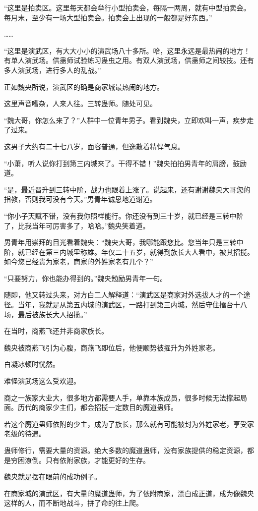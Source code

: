 \begin{this_body}
“这里是拍卖区。这里每天都会举行小型拍卖会，每隔一两周，就有中型拍卖会。每月末，至少有一场大型拍卖会。拍卖会上出现的一般都是好东西。”

……

“这里是演武区，有大大小小的演武场八十多所。哈，这里永远是最热闹的地方！有单人演武场。供蛊师试验练习蛊虫之用。有双人演武场，供蛊师之间较技。还有多人演武场，进行多人的乱战。”

正如魏央所说，演武区的确是商家城最热闹的地方。

这里声音嘈杂，人来人往。三转蛊师。随处可见。

“魏大哥，你怎么来了？”人群中一位青年男子。看到魏央，立即欢叫一声，疾步走了过来。

这男子大约有二十七八岁，面容普通，但逸散着精悍气息。

“小萧，听人说你打到第三内城来了。干得不错！”魏央拍拍男青年的肩膀，鼓励道。

“是，最近晋升到三转中阶，战力也跟着上涨了。说起来，还有谢谢魏央大哥您的指教，否则我可没有今天。”男青年诚恳地道谢道。

“你小子天赋不错，没有我你照样能行。你还没有到三十岁，就已经是三转中阶了，比我当年可厉害多了，哈哈。”魏央笑着道。

男青年用崇拜的目光看着魏央：“魏央大哥，我哪能跟您比。您当年只是三转中阶，就已经在第三内城里称雄。年仅二十五岁，就得到族长大人看中，被其招揽。如今您已经贵为家老，商家的外姓家老有几个？”

“只要努力，你也能办得到的。”魏央勉励男青年一句。

随即，他又转过头来，对方白二人解释道：“演武区是商家对外选拔人才的一个途径。当年，我就是从第五内城的演武区，一路打到第三内城，然后守住擂台十八场，最后被族长大人招揽。”

在当时，商燕飞还并非商家族长。

魏央被商燕飞引为心腹，商燕飞即位后，他便顺势被擢升为外姓家老。

白凝冰顿时恍然。

难怪演武场这么受欢迎。

商之一族家大业大，很多地方都需要人手，单靠本族成员，很多时候无法撑起局面。历代的商家少主们，都会招揽一定数目的魔道蛊师。

若这个魔道蛊师依附的少主，成为了族长，那么就有可能被封为外姓家老，享受家老级的待遇。

蛊师修行，需要大量的资源。绝大多数的魔道蛊师，没有家族提供的稳定资源，都是穷困潦倒。只有依附家族，才能更好的生存。

魏央就是摆在眼前的成功例子。

在商家城的演武区，有大量的魔道蛊师，为了依附商家，漂白成正道，成为像魏央这样的人，而不断地战斗，拼了命的往上爬。


\end{this_body}
